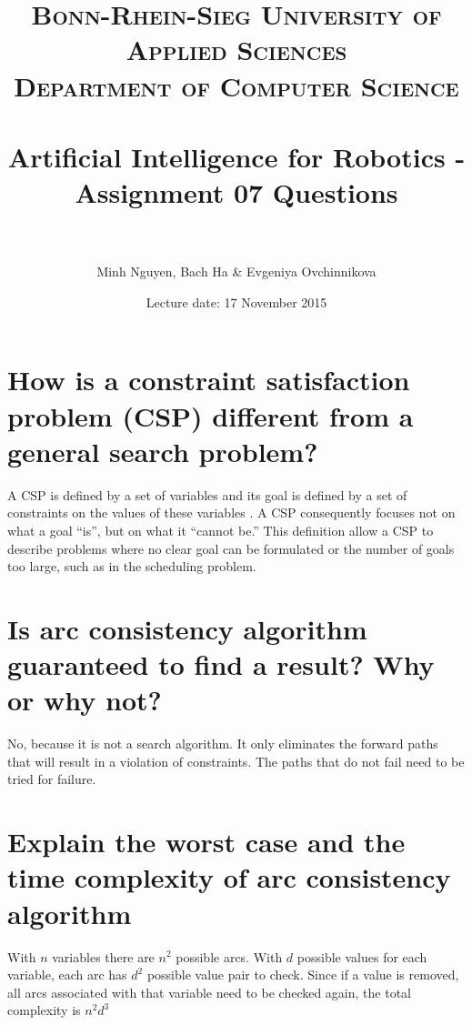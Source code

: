\documentclass[paper=a4, fontsize=11pt]{scrartcl} %
\title{	
\normalfont \normalsize 
\textsc{Bonn-Rhein-Sieg University of Applied Sciences \\Department of Computer Science} \\ [10pt] %
\horrule{0.5pt} \\[0.4cm] %
\LARGE Artificial Intelligence for Robotics - Assignment 07 Questions \\ %
\horrule{2pt} \\[0.5cm] %
}
\author{Minh Nguyen, Bach Ha \& Evgeniya Ovchinnikova} %
\date{Lecture date: 17 November 2015}
\begin{document}
\maketitle %


\section{How is a constraint satisfaction problem (CSP) different from a general search problem?}

A CSP is defined by a set of variables and its goal is defined by a set of constraints on the values of these variables \cite{Russell96AI}. A CSP consequently focuses not on what a goal ``is'', but on what it ``cannot be.'' This definition allow a CSP to describe problems where no clear goal can be formulated or the number of goals too large, such as in the scheduling problem.


\section{Is arc consistency algorithm guaranteed to find a result? Why or why not?}

No, because it is not a search algorithm. It only eliminates the forward paths that will result in a violation of constraints. The paths that do not fail need to be tried for failure.


\section{Explain the worst case and the time complexity of arc consistency algorithm}

With $n$ variables there are $n^2$ possible arcs. With $d$ possible values for each variable, each arc has $d^2$ possible value pair to check. Since if a value is removed, all arcs associated with that variable need to be checked again, the total complexity is $n^2d^3$



\end{document}
